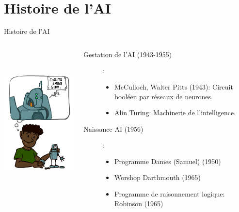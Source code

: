 \documentclass{beamer}
\begin{document}
\section{Histoire de l'AI}%
\label{sec:histoire_de_l_ai}

\begin{frame}[<+->]{Histoire de l'AI}
 \begin{columns}

   \begin{column}{0.3\textwidth}
\centering
\includegraphics[width=1\linewidth,height=8cm]{./images/dream_ai.png}
   \end{column}
   \begin{column}{0.7\textwidth}
     {\scriptsize
    \begin{description}
      \item[\scriptsize Gestation de l'AI (1943-1955)]: 
        \begin{itemize}
          \item McCulloch, Walter Pitts (1943): Circuit booléen par réseaux de
            neurones.
          \item Alin Turing: Machinerie de l'intelligence.
      \end{itemize}
      \item[\scriptsize Naissance AI (1956)]:
        \begin{itemize}
          \item Programme Dames (Samuel) (1950)
          \item Worshop Darthmouth (1965)
          \item Programme de raisonnement logique: Robinson (1965)
        \end{itemize}


\end{description}}
\end{column}
\end{columns}
\end{frame}
\end{document}

